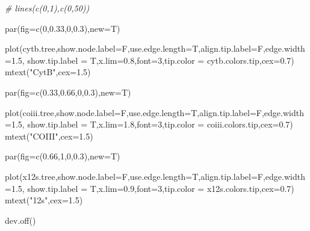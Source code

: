 \documentclass[
]{article}
\newenvironment{Shaded}{\begin{snugshade}}{\end{snugshade}}
\newcommand{\AttributeTok}[1]{\textcolor[rgb]{0.77,0.63,0.00}{#1}}
\newcommand{\CommentTok}[1]{\textcolor[rgb]{0.56,0.35,0.01}{\textit{#1}}}
\newcommand{\DecValTok}[1]{\textcolor[rgb]{0.00,0.00,0.81}{#1}}
\newcommand{\FloatTok}[1]{\textcolor[rgb]{0.00,0.00,0.81}{#1}}
\newcommand{\FunctionTok}[1]{\textcolor[rgb]{0.00,0.00,0.00}{#1}}
\newcommand{\NormalTok}[1]{#1}
\newcommand{\StringTok}[1]{\textcolor[rgb]{0.31,0.60,0.02}{#1}}
\begin{document}
\begin{Shaded}
\begin{Highlighting}[]
\CommentTok{\#  lines(c(0,1),c(0,50))}


  \FunctionTok{par}\NormalTok{(}\AttributeTok{fig=}\FunctionTok{c}\NormalTok{(}\DecValTok{0}\NormalTok{,}\FloatTok{0.33}\NormalTok{,}\DecValTok{0}\NormalTok{,}\FloatTok{0.3}\NormalTok{),}\AttributeTok{new=}\NormalTok{T)}

  \FunctionTok{plot}\NormalTok{(cytb.tree,}\AttributeTok{show.node.label=}\NormalTok{F,}\AttributeTok{use.edge.length=}\NormalTok{T,}\AttributeTok{align.tip.label=}\NormalTok{F,}\AttributeTok{edge.width=}\FloatTok{1.5}\NormalTok{,}
     \AttributeTok{show.tip.label =}\NormalTok{ T,}\AttributeTok{x.lim=}\FloatTok{0.8}\NormalTok{,}\AttributeTok{font=}\DecValTok{3}\NormalTok{,}\AttributeTok{tip.color =}\NormalTok{ cytb.colors.tip,}\AttributeTok{cex=}\FloatTok{0.7}\NormalTok{)}
  \FunctionTok{mtext}\NormalTok{(}\StringTok{"CytB"}\NormalTok{,}\AttributeTok{cex=}\FloatTok{1.5}\NormalTok{)}

  \FunctionTok{par}\NormalTok{(}\AttributeTok{fig=}\FunctionTok{c}\NormalTok{(}\FloatTok{0.33}\NormalTok{,}\FloatTok{0.66}\NormalTok{,}\DecValTok{0}\NormalTok{,}\FloatTok{0.3}\NormalTok{),}\AttributeTok{new=}\NormalTok{T)}

  \FunctionTok{plot}\NormalTok{(coiii.tree,}\AttributeTok{show.node.label=}\NormalTok{F,}\AttributeTok{use.edge.length=}\NormalTok{T,}\AttributeTok{align.tip.label=}\NormalTok{F,}\AttributeTok{edge.width=}\FloatTok{1.5}\NormalTok{,}
     \AttributeTok{show.tip.label =}\NormalTok{ T,}\AttributeTok{x.lim=}\FloatTok{1.8}\NormalTok{,}\AttributeTok{font=}\DecValTok{3}\NormalTok{,}\AttributeTok{tip.color =}\NormalTok{ coiii.colors.tip,}\AttributeTok{cex=}\FloatTok{0.7}\NormalTok{)}
  \FunctionTok{mtext}\NormalTok{(}\StringTok{"COIII"}\NormalTok{,}\AttributeTok{cex=}\FloatTok{1.5}\NormalTok{)}

  \FunctionTok{par}\NormalTok{(}\AttributeTok{fig=}\FunctionTok{c}\NormalTok{(}\FloatTok{0.66}\NormalTok{,}\DecValTok{1}\NormalTok{,}\DecValTok{0}\NormalTok{,}\FloatTok{0.3}\NormalTok{),}\AttributeTok{new=}\NormalTok{T)}

  \FunctionTok{plot}\NormalTok{(x12s.tree,}\AttributeTok{show.node.label=}\NormalTok{F,}\AttributeTok{use.edge.length=}\NormalTok{T,}\AttributeTok{align.tip.label=}\NormalTok{F,}\AttributeTok{edge.width=}\FloatTok{1.5}\NormalTok{,}
     \AttributeTok{show.tip.label =}\NormalTok{ T,}\AttributeTok{x.lim=}\FloatTok{0.9}\NormalTok{,}\AttributeTok{font=}\DecValTok{3}\NormalTok{,}\AttributeTok{tip.color =}\NormalTok{ x12s.colors.tip,}\AttributeTok{cex=}\FloatTok{0.7}\NormalTok{)}
  \FunctionTok{mtext}\NormalTok{(}\StringTok{"12s"}\NormalTok{,}\AttributeTok{cex=}\FloatTok{1.5}\NormalTok{)}

\FunctionTok{dev.off}\NormalTok{()}
\end{Highlighting}
\end{Shaded}
\end{document}
